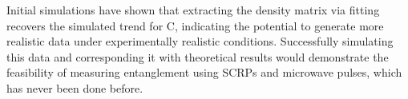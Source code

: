     {
    Initial simulations have shown that extracting the density matrix via fitting recovers the simulated trend for C, indicating the potential to generate more realistic data under experimentally realistic conditions. Successfully simulating this data and corresponding it with theoretical results would demonstrate the feasibility of measuring entanglement using SCRPs and microwave pulses, which has never been done before.
    }

    \newpage
    